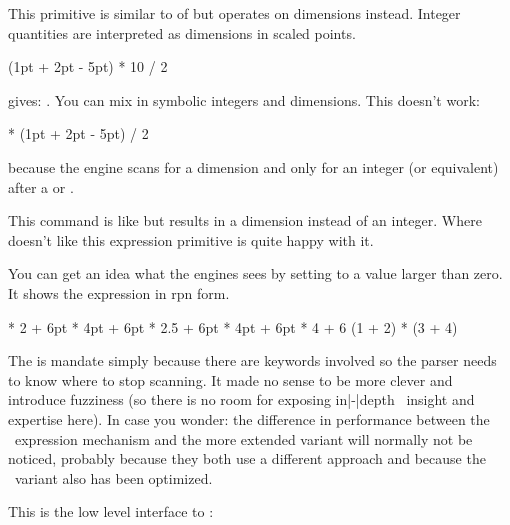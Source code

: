 \startoldprimitive[title={\prm {dimexpr}}]

This primitive is similar to of  but operates on dimensions
instead. Integer quantities are interpreted as dimensions in scaled points.

\startbuffer
\the\dimexpr (1pt + 2pt - 5pt) * 10 / 2 \relax
\stopbuffer

\typebuffer

gives: \inlinebuffer. You can mix in symbolic integers and dimensions. This doesn't work:

\startbuffer
\the{} * (1pt + 2pt - 5pt) / 2 \relax
\stopbuffer

because the engine scans for a dimension and only for an integer (or equivalent)
after a \type {*} or \type {/}.


\stopoldprimitive

\startnewprimitive[title={\prm {dimexpression}}]

This command is like  but results in a dimension instead of
an integer. Where  doesn't like  this expression
primitive is quite happy with it.

You can get an idea what the engines sees by setting 
to a value larger than zero. It shows the expression in rpn form.

\starttyping
\dimexpression 4pt * 2   + 6pt   \relax
{}   * 4pt + 6pt   \relax
\dimexpression 4pt * 2.5 + 6pt   \relax
{} * 4pt + 6pt   \relax
{} * 4 + 6         \relax
\numexpression (1 + 2) * (3 + 4) \relax
\stoptyping

The  is mandate simply because there are keywords involved so the
parser needs to know where to stop scanning. It made no sense to be more clever
and introduce fuzziness (so there is no room for exposing in|-|depth \TEX\
insight and expertise here). In case you wonder: the difference in performance
between the \ETEX\ expression mechanism and the more extended variant will
normally not be noticed, probably because they both use a different approach and
because the \ETEX\ variant also has been optimized.

\stopnewprimitive

\startnewprimitive[title={\prm {directlua}}]

This is the low level interface to \LUA:

\startbuffer
{}
\stopbuffer

